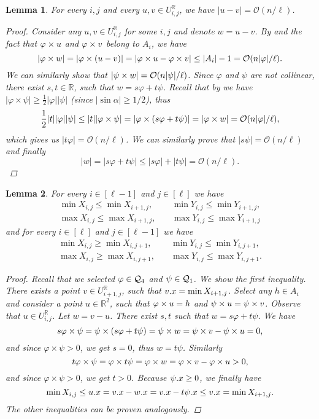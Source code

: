 \documentclass[11pt]{article}
\newcommand{\R}{\mathbb{R}}
\renewcommand{\O}{\mathcal{O}}
\renewcommand{\phi}{\varphi}
\newcommand{\eq}[1]{\begin{align*} #1 \end{align*}}
\theoremstyle{plain}
\newtheorem{lemma}{Lemma}
\theoremstyle{definition}
\theoremstyle{remark}
\begin{document}
\begin{lemma}\label{distance_bound}
	For every $i, j$ and every $u, v \in U^\R_{i, j}$, we have $|u - v| = \O(n / \ell)$.
	\begin{proof}
		Consider any $u, v \in U^\R_{i, j}$ for some $i, j$ and denote $w = u - v$.
		By  and the fact that $\h{u}$ and $\h{v}$ belong to $A_i$, we have
		$$ |\h{w}| = |\h{(u - v)}| = |\h{u} - \h{v}| \le |A_i| - 1 = \O(n|\phi| / \ell).$$
		We can similarly show that $|\s{w}| = \O(n|\psi| / \ell)$.
		Since $\phi$ and $\psi$ are not collinear, there exist $s, t \in \mathbb{R}$, such that $w = s\phi + t\psi$.
		Recall that by  we have $|\phi \times \psi| \ge \frac{1}{2}|\phi||\psi|$ (since $|\sin \alpha| \ge 1/2$), thus
		$$ \frac{1}{2}|t||\phi||\psi| \le |t||\phi \times \psi| = |\phi \times (s\phi + t\psi)| = |\h{w}| = \O(n|\phi| / \ell), $$
		which gives us $|t\phi| = \O(n / \ell)$.
		We can similarly prove that $|s\psi| = \O(n / \ell)$ and finally
		$$ |w| = |s\phi + t\psi| \le |s\phi| + |t\psi| = \O(n / \ell). $$
	\end{proof}
\end{lemma}


\begin{lemma}
	For every $i \in [\ell - 1]$ and $j \in [\ell]$ we have
	\eq{
		\min X_{i, j} \le \min X_{i + 1, j}, \quad
		&\min Y_{i, j} \le \min Y_{i + 1, j}, \\
		\max X_{i, j} \le \max X_{i + 1, j}, \quad
		&\max Y_{i, j} \le \max Y_{i + 1, j}
	}
	and for every $i \in [\ell]$ and $j \in [\ell - 1]$ we have
	\eq{
		\min X_{i, j} \ge \min X_{i, j + 1}, \quad
		&\min Y_{i, j} \le \min Y_{i, j + 1}, \\
		\max X_{i, j} \ge \max X_{i, j + 1}, \quad
		&\max Y_{i, j} \le \max Y_{i, j + 1}.
	}
	\begin{proof}
		Recall that we selected $\phi \in \Q_4$ and $\psi \in \mathcal{Q}_1$.
		We show the first inequality.
		There exists a point $v \in U^\R_{i + 1, j}$, such that $v.x = \min X_{i + 1, j}$.
		Select any $h \in A_i$ and consider a point $u \in \R^2$, such that $\h{u} = h$ and $\psi \times u = \psi \times v$.
		Observe that $u \in U^\R_{i, j}$.
		Let $w = v - u$.
		There exist $s, t$ such that $w = s\phi + t\psi$.
		We have
		$$ s \phi \times \psi = \s{(s\phi + t\psi)} = \s{w} = \s{v} - \s{u} = 0, $$
		and since $\phi \times \psi > 0$, we get $s = 0$, thus $w = t\psi$.
		Similarly
		$$ t \phi \times \psi = \phi \times t\psi = \h{w} = \h{v} - \h{u} > 0,$$
		and since $\phi \times \psi > 0$, we get $t > 0$. Because $\psi.x \ge 0$, we finally have
		$$ \min X_{i, j} \le u.x = v.x - w.x = v.x - t\psi.x \le v.x = \min X_{i + 1, j}. $$
		The other inequalities can be proven analogously.
	\end{proof}
\end{lemma}
\end{document}
